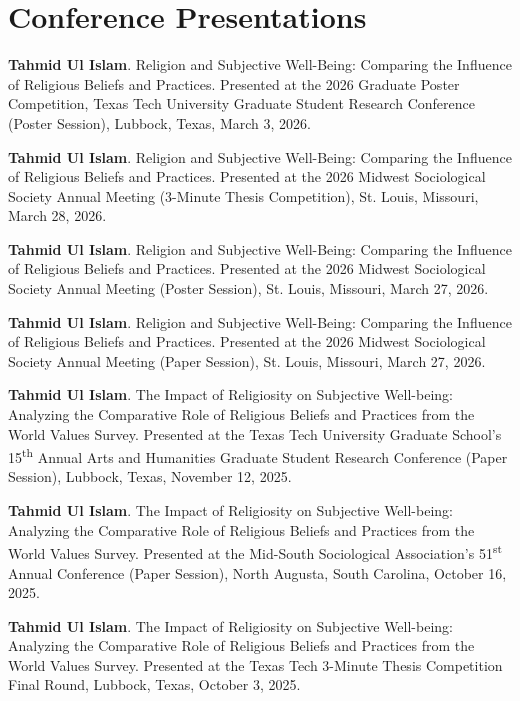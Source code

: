 \documentclass[letterpaper,10pt]{article}
\begin{document}
    \section{Conference Presentations}
    \begin{description}
        \item{\textbf{Tahmid Ul Islam}. Religion and Subjective Well-Being: Comparing the Influence of Religious Beliefs and Practices. Presented at the
            2026 Graduate Poster Competition, Texas Tech University
            Graduate Student Research Conference (Poster Session), Lubbock, Texas, March 3,
            2026.}
        \item{\textbf{Tahmid Ul Islam}. Religion and Subjective Well-Being: Comparing the Influence of Religious Beliefs and Practices. Presented at
            the 2026 Midwest Sociological Society Annual Meeting (3-Minute Thesis Competition), St. Louis, Missouri, March 28, 2026.}
        \item{\textbf{Tahmid Ul Islam}. Religion and Subjective Well-Being: Comparing the Influence of Religious Beliefs and Practices. Presented at
            the 2026 Midwest Sociological Society Annual Meeting (Poster Session), St. Louis, Missouri, March 27, 2026.}
        \item{\textbf{Tahmid Ul Islam}. Religion and Subjective Well-Being: Comparing the Influence of Religious Beliefs and Practices. Presented at
            the 2026 Midwest Sociological Society Annual Meeting (Paper Session), St. Louis, Missouri, March 27, 2026.}
        \item{\textbf{Tahmid Ul Islam}. The Impact of Religiosity on Subjective
            Well-being: Analyzing the Comparative Role of Religious Beliefs
            and Practices from the World Values Survey. Presented at the Texas
            Tech University Graduate School’s 15\textsuperscript{th} Annual Arts and Humanities
            Graduate Student Research Conference (Paper Session), Lubbock, Texas, November 12,
            2025.}
        \item{\textbf{Tahmid Ul Islam}. The Impact of Religiosity on Subjective
            Well-being: Analyzing the Comparative Role of Religious Beliefs
            and Practices from the World Values Survey. Presented at the
            Mid-South Sociological Association’s 51\textsuperscript{st} Annual Conference (Paper Session), North
            Augusta, South Carolina, October 16, 2025.}
        \item{\textbf{Tahmid Ul Islam}. The Impact of Religiosity on Subjective
            Well-being: Analyzing the Comparative Role of Religious Beliefs
            and Practices from the World Values Survey. Presented at the
            Texas Tech 3-Minute Thesis Competition Final Round, Lubbock, Texas, October
            3, 2025.}
    \end{description}
    \vspace{0.65em} %
\end{document}
